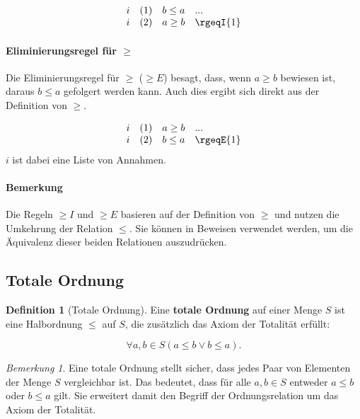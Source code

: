 \documentclass{book}
\theoremstyle{plain}
\theoremstyle{remark}
\newtheorem*{remark}{Bemerkung}
\theoremstyle{definition}
\newtheorem{definition}{Definition}[section]
\begin{document}
\[
\begin{array}{llll}
    i & (1) & b \leq a & \text{...} \\
    i & (2) & a \geq b & \rgeqI{1} \\
\end{array}
\]

\paragraph{Eliminierungsregel für \(\geq\) }
\label{rule:rgeqE}
Die Eliminierungsregel für \(\geq\) (\(\geq E\)) besagt, dass, wenn \(a \geq b\) bewiesen ist, daraus \(b \leq a\) gefolgert werden kann. Auch dies ergibt sich direkt aus der Definition von \(\geq\).

\[
\begin{array}{llll}
    i & (1) & a \geq b & \text{...} \\
    i & (2) & b \leq a & \rgeqE{1} \\
\end{array}
\]
\(i\) ist dabei eine Liste von Annahmen.

\paragraph{Bemerkung}

Die Regeln \(\geq I\) und \(\geq E\) basieren auf der Definition von \(\geq\) und nutzen die Umkehrung der Relation \(\leq\). Sie können in Beweisen verwendet werden, um die Äquivalenz dieser beiden Relationen auszudrücken.

\subsection{Totale Ordnung}

\begin{definition}[Totale Ordnung]
    Eine \textbf{totale Ordnung} auf einer Menge \(S\) ist eine Halbordnung \(\leq\) auf \(S\), die zusätzlich das Axiom der Totalität erfüllt:
    
    \[
    \forall a, b \in S (a \leq b \lor b \leq a).
    \]
\end{definition}

\begin{remark}
    Eine totale Ordnung stellt sicher, dass jedes Paar von Elementen der Menge \(S\) vergleichbar ist. Das bedeutet, dass für alle \(a, b \in S\) entweder \(a \leq b\) oder \(b \leq a\) gilt. Sie erweitert damit den Begriff der Ordnungsrelation um das Axiom der Totalität.
\end{remark}
\end{document}
